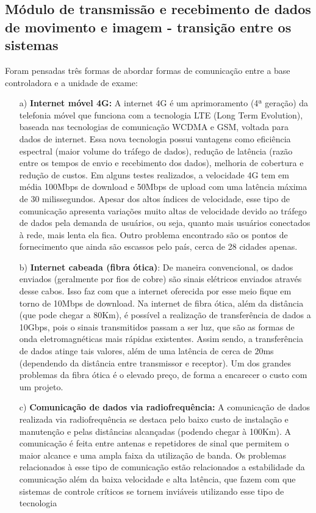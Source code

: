 \documentclass[a4paper]{article}
\begin{document}
\subsection{Módulo de transmissão e recebimento de dados de movimento e imagem - transição entre os sistemas}

Foram pensadas três formas de abordar formas de comunicação entre a base controladora e a unidade de exame: 

\begin{enumerate}
\item[a)] \textbf{Internet móvel 4G:} A internet 4G é um aprimoramento (4ª geração) da telefonia móvel que funciona com a tecnologia LTE (Long Term Evolution), baseada nas tecnologias de comunicação WCDMA e GSM, voltada para dados de internet. Essa nova tecnologia possui vantagens como eficiência espectral (maior volume do tráfego de dados),  redução de latência (razão entre os tempos de envio e recebimento dos dados), melhoria de cobertura e redução de custos. Em alguns testes realizados, a velocidade 4G tem em média 100Mbps de download e 50Mbps de upload com uma latência máxima de 30 milissegundos. Apesar dos altos índices de velocidade, esse tipo de comunicação apresenta variações muito altas de velocidade devido ao tráfego de dados pela demanda de usuários, ou seja, quanto mais usuários conectados à rede, mais lenta ela fica. Outro problema encontrado são os pontos de fornecimento que ainda são escassos pelo país, cerca de 28 cidades apenas.
\item[b)] \textbf{Internet cabeada (fibra ótica)}:  De maneira convencional, os dados enviados (geralmente por fios de cobre) são sinais elétricos enviados através desse cabos. Isso faz com que a internet oferecida por esse meio fique em torno de 10Mbps de download. Na internet de fibra ótica, além da distância (que pode chegar a 80Km), é possível a realização de transferência de dados a 10Gbps, pois o sinais transmitidos passam a ser luz, que são as formas de onda eletromagnéticas mais rápidas existentes. Assim sendo, a transferência de dados atinge tais valores, além de uma latência de cerca de 20ms (dependendo da distância entre transmissor e receptor). Um dos grandes problemas da fibra ótica é o elevado preço, de forma a encarecer o custo com um projeto.
\item[c)] \textbf{Comunicação de dados via radiofrequência:} A comunicação de dados realizada via radiofrequência se destaca pelo baixo custo de instalação e manutenção e pelas distâncias alcançadas (podendo chegar à 100Km). A comunicação é feita entre antenas e repetidores de sinal que permitem o maior alcance e uma ampla faixa da utilização de banda. Os problemas relacionados à esse tipo de comunicação estão relacionados a estabilidade da comunicação além da baixa velocidade e alta latência, que fazem com que sistemas de controle críticos se tornem inviáveis utilizando esse tipo de tecnologia
\end{enumerate}
\end{document}
